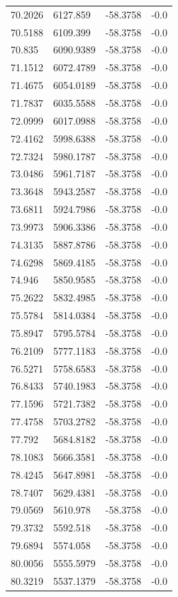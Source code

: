 \begin{table}[H]
\begin{tabular}{llll}
70.2026 & 6127.859 & -58.3758 & -0.0 \\
70.5188 & 6109.399 & -58.3758 & -0.0 \\
70.835 & 6090.9389 & -58.3758 & -0.0 \\
71.1512 & 6072.4789 & -58.3758 & -0.0 \\
71.4675 & 6054.0189 & -58.3758 & -0.0 \\
71.7837 & 6035.5588 & -58.3758 & -0.0 \\
72.0999 & 6017.0988 & -58.3758 & -0.0 \\
72.4162 & 5998.6388 & -58.3758 & -0.0 \\
72.7324 & 5980.1787 & -58.3758 & -0.0 \\
73.0486 & 5961.7187 & -58.3758 & -0.0 \\
73.3648 & 5943.2587 & -58.3758 & -0.0 \\
73.6811 & 5924.7986 & -58.3758 & -0.0 \\
73.9973 & 5906.3386 & -58.3758 & -0.0 \\
74.3135 & 5887.8786 & -58.3758 & -0.0 \\
74.6298 & 5869.4185 & -58.3758 & -0.0 \\
74.946 & 5850.9585 & -58.3758 & -0.0 \\
75.2622 & 5832.4985 & -58.3758 & -0.0 \\
75.5784 & 5814.0384 & -58.3758 & -0.0 \\
75.8947 & 5795.5784 & -58.3758 & -0.0 \\
76.2109 & 5777.1183 & -58.3758 & -0.0 \\
76.5271 & 5758.6583 & -58.3758 & -0.0 \\
76.8433 & 5740.1983 & -58.3758 & -0.0 \\
77.1596 & 5721.7382 & -58.3758 & -0.0 \\
77.4758 & 5703.2782 & -58.3758 & -0.0 \\
77.792 & 5684.8182 & -58.3758 & -0.0 \\
78.1083 & 5666.3581 & -58.3758 & -0.0 \\
78.4245 & 5647.8981 & -58.3758 & -0.0 \\
78.7407 & 5629.4381 & -58.3758 & -0.0 \\
79.0569 & 5610.978 & -58.3758 & -0.0 \\
79.3732 & 5592.518 & -58.3758 & -0.0 \\
79.6894 & 5574.058 & -58.3758 & -0.0 \\
80.0056 & 5555.5979 & -58.3758 & -0.0 \\
80.3219 & 5537.1379 & -58.3758 & -0.0 \\

\end{tabular}
\end{table}

